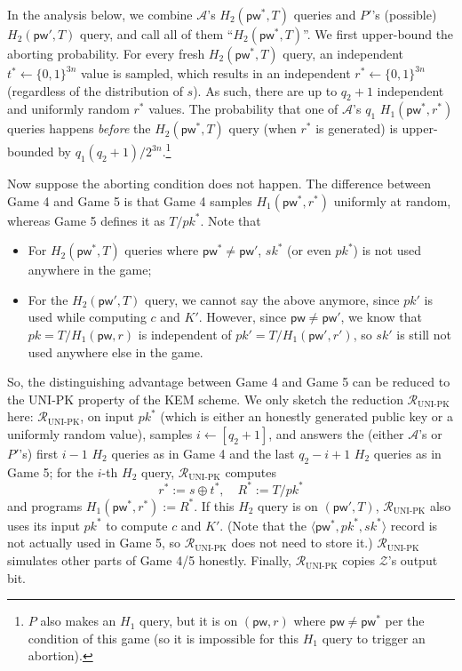 \documentclass{article}
\theoremstyle{plain}
\theoremstyle{definition}
\theoremstyle{remark}
\newcommand{\adv}{\mathcal{A}}
\newcommand{\env}{\mathcal{Z}}
\newcommand{\red}{\mathcal{R}}
\newcommand{\pw}{\mathsf{pw}}
\begin{document}
In the analysis below, we combine $\adv$'s $H_2(\pw^*,T)$ queries and $P'$'s (possible) $H_2(\pw',T)$ query, and call all of them ``$H_2(\pw^*,T)$''. We first upper-bound the aborting probability. For every fresh $H_2(\pw^*,T)$ query, an independent $t^* \gets \{0,1\}^{3n}$ value is sampled, which results in an independent $r^* \gets \{0,1\}^{3n}$ (regardless of the distribution of $s$). As such, there are up to $q_2+1$ independent and uniformly random $r^*$ values. The probability that one of $\adv$'s $q_1$ $H_1(\pw^*,r^*)$ queries happens \emph{before} the $H_2(\pw^*,T)$ query (when $r^*$ is generated) is upper-bounded by $q_1(q_2+1)/2^{3n}$.\footnote{$P$ also makes an $H_1$ query, but it is on $(\pw,r)$ where $\pw \neq \pw^*$ per the condition of this game (so it is impossible for this $H_1$ query to trigger an abortion).}

Now suppose the aborting condition does not happen. The difference between Game 4 and Game 5 is that Game 4 samples $H_1(\pw^*,r^*)$ uniformly at random, whereas Game 5 defines it as $T/pk^*$. Note that
\begin{itemize}
  \item For $H_2(\pw^*,T)$ queries where $\pw^* \neq \pw'$, $sk^*$ (or even $pk^*$) is not used anywhere in the game;
  \item For the $H_2(\pw',T)$ query, we cannot say the above anymore, since $pk'$ is used while computing $c$ and $K'$. However, since $\pw \neq \pw'$, we know that $pk = T/H_1(\pw,r)$ is independent of $pk' = T/H_1(\pw',r')$, so $sk'$ is still not used anywhere else in the game.
\end{itemize}
So, the distinguishing advantage between Game 4 and Game 5 can be reduced to the UNI-PK property of the KEM scheme. We only sketch the reduction $\red_\text{UNI-PK}$ here: $\red_\text{UNI-PK}$, on input $pk^*$ (which is either an honestly generated public key or a uniformly random value), samples $i \gets [q_2+1]$, and answers the (either $\adv$'s or $P'$'s) first $i-1$ $H_2$ queries as in Game 4 and the last $q_2-i+1$ $H_2$ queries as in Game 5; for the $i$-th $H_2$ query, $\red_\text{UNI-PK}$ computes
\[
r^* := s \oplus t^*, \quad R^* := T/pk^*
\]
and programs $H_1(\pw^*,r^*) := R^*$. If this $H_2$ query is on $(\pw',T)$, $\red_\text{UNI-PK}$ also uses its input $pk^*$ to compute $c$ and $K'$. (Note that the $\langle\pw^*,pk^*,sk^*\rangle$ record is not actually used in Game 5, so $\red_\text{UNI-PK}$ does not need to store it.) $\red_\text{UNI-PK}$ simulates other parts of Game 4/5 honestly. Finally, $\red_\text{UNI-PK}$ copies $\env$'s output bit.
\end{document}
